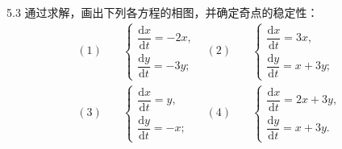 \documentclass[UTF8,a4paper,11pt]{ctexart}
\begin{document}
\begin{problem}{5.3}
通过求解，画出下列各方程的相图，并确定奇点的稳定性：
\[
\begin{aligned}
(1)\quad&
\begin{cases}
\dfrac{\mathrm dx}{\mathrm dt}=-2x,\\
\dfrac{\mathrm dy}{\mathrm dt}=-3y;
\end{cases}
&
(2)\quad&
\begin{cases}
\dfrac{\mathrm dx}{\mathrm dt}=3x,\\
\dfrac{\mathrm dy}{\mathrm dt}=x+3y;
\end{cases}\\[12pt]
(3)\quad&
\begin{cases}
\dfrac{\mathrm dx}{\mathrm dt}=y,\\
\dfrac{\mathrm dy}{\mathrm dt}=-x;
\end{cases}
&
(4)\quad&
\begin{cases}
\dfrac{\mathrm dx}{\mathrm dt}=2x+3y,\\
\dfrac{\mathrm dy}{\mathrm dt}=x+3y.
\end{cases}
\end{aligned}
\]
\end{problem}
\end{document}
